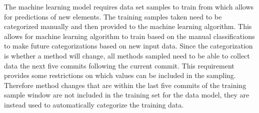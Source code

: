 The machine learning model requires data set samples to train from which allows for predictions of new elements. The training samples taken need to be categorized manually and then provided to the machine learning algorithm. This allows for machine learning algorithm to train based on the manual classifications to make future categorizations based on new input data. Since the categorization is whether a method will change, all methods sampled need to be able to collect data the next five commits following the current commit. This requirement provides some restrictions on which values can be included in the sampling. Therefore method changes that are within the last five commits of the training sample window are not included in the training set for the data model, they are instead used to automatically categorize the training data.

